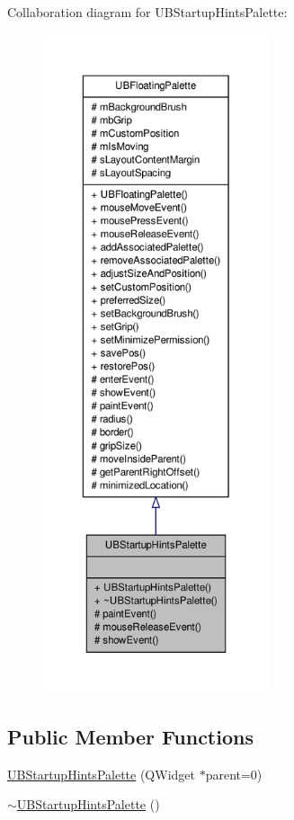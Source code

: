 Collaboration diagram for U\-B\-Startup\-Hints\-Palette\-:
\nopagebreak
\begin{figure}[H]
\begin{center}
\leavevmode
\includegraphics[height=550pt]{d8/dfa/class_u_b_startup_hints_palette__coll__graph}
\end{center}
\end{figure}
\subsection*{Public Member Functions}
\begin{DoxyCompactItemize}
\item 
\hyperlink{class_u_b_startup_hints_palette_aad63bc3c56b04a4632294e74cacef6a6}{U\-B\-Startup\-Hints\-Palette} (Q\-Widget $\ast$parent=0)
\item 
\hyperlink{class_u_b_startup_hints_palette_aa7048c02b06ef3cd3c9abfd75db0a010}{$\sim$\-U\-B\-Startup\-Hints\-Palette} ()
\end{DoxyCompactItemize}
